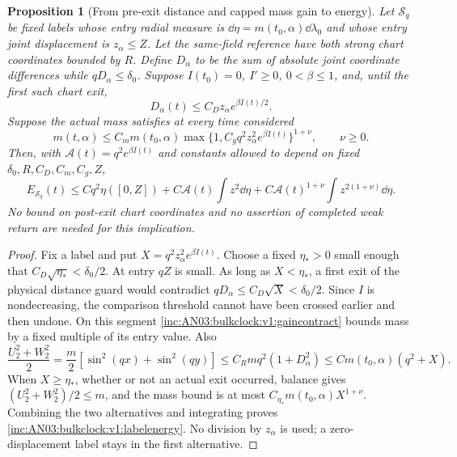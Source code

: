 \documentclass[11pt]{article}
\newtheorem{proposition}[theorem]{Proposition}
\theoremstyle{remark}\newtheorem{remark}[theorem]{Remark}
\newcommand{\Sec}{\mathcal S_q}
\begin{document}
\begin{proposition}[From pre-exit distance and capped mass gain to energy]
\label{inc:AN03:bulkclock:v1:gainenergy}
Let $\Sec$ be fixed labels whose entry radial measure is $\dd\eta=m(t_0,\alpha)\dd\lambda_0$ and whose entry joint displacement is $z_\alpha\le Z$. Let the same-field reference have both strong chart coordinates bounded by $R$. Define $D_\alpha$ to be the sum of absolute joint coordinate differences while $qD_\alpha\le\delta_0$. Suppose $I(t_0)=0$, $I'\ge0$, $0<\beta\le1$, and, until the first such chart exit,
\[
 D_\alpha(t)\le C_Dz_\alpha e^{\beta I(t)/2}.
\]
Suppose the actual mass satisfies at every time considered
\begin{equation}\label{inc:AN03:bulkclock:v1:gaincontract}
 m(t,\alpha)\le C_m m(t_0,\alpha)
 \max\{1,C_gq^2z_\alpha^2e^{\beta I(t)}\}^{1+\nu},\qquad \nu\ge0.
\end{equation}
Then, with $\mathcal A(t)=q^2e^{\beta I(t)}$ and constants allowed to depend on fixed $\delta_0,R,C_D,C_m,C_g,Z$,
\begin{equation}\label{inc:AN03:bulkclock:v1:labelenergy}
 E_{\Sec}(t)\le Cq^2\eta([0,Z])+
 C\mathcal A(t)\int z^2\dd\eta+
 C\mathcal A(t)^{1+\nu}\int z^{2(1+\nu)}\dd\eta.
\end{equation}
No bound on post-exit chart coordinates and no assertion of completed weak return are needed for this implication.
\end{proposition}
\begin{proof}
Fix a label and put $X=q^2z_\alpha^2e^{\beta I(t)}$. Choose a fixed $\eta_*>0$ small enough that $C_D\sqrt{\eta_*}<\delta_0/2$. At entry $qZ$ is small. As long as $X<\eta_*$, a first exit of the physical distance guard would contradict $qD_\alpha\le C_D\sqrt X<\delta_0/2$. Since $I$ is nondecreasing, the comparison threshold cannot have been crossed earlier and then undone. On this segment \eqref{inc:AN03:bulkclock:v1:gaincontract} bounds mass by a fixed multiple of its entry value. Also
\[
 \frac{U_2^2+W_2^2}{2}
 =\frac m2[\sin^2(qx)+\sin^2(qy)]
 \le C_Rm q^2(1+D_\alpha^2)
 \le C m(t_0,\alpha)(q^2+X).
\]
When $X\ge\eta_*$, whether or not an actual exit occurred, balance gives $(U_2^2+W_2^2)/2\le m$, and the mass bound is at most $C_{\eta_*}m(t_0,\alpha)X^{1+\nu}$. Combining the two alternatives and integrating proves \eqref{inc:AN03:bulkclock:v1:labelenergy}. No division by $z_\alpha$ is used; a zero-displacement label stays in the first alternative.
\end{proof}
\end{document}
